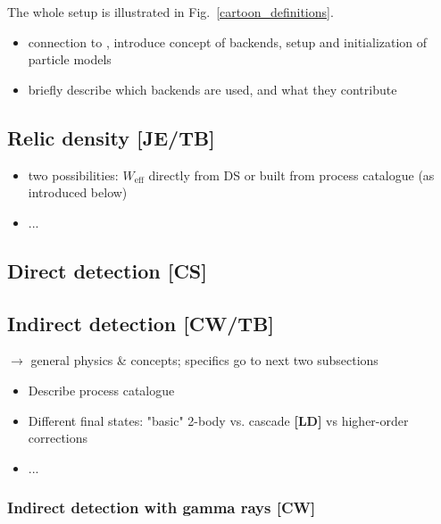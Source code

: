 The whole setup is illustrated in Fig.~\ref{cartoon_definitions}.

\begin{itemize}
  \item connection to \GB, introduce concept of backends, setup and
    initialization of particle models
  \item briefly describe which backends are used, and what they contribute 
\end{itemize}

\subsection{Relic density {\bf [JE/TB]}}
\label{code_rd}
\begin{itemize}
  \item two possibilities: $W_\mathrm{eff}$ directly from DS or built from
    process catalogue (as introduced below)
  \item...
\end{itemize}

\subsection{Direct detection {\bf [CS]}}
\label{code_dd}


\subsection{Indirect detection {\bf [CW/TB]}}
\label{code_id}

$\to$ general physics \& concepts; specifics go to next two subsections
\begin{itemize}
\item Describe process catalogue 
\item Different final states: "basic" 2-body vs. cascade {\bf [LD]} vs higher-order corrections
\item...
\end{itemize}

\subsubsection{Indirect detection with gamma rays {\bf [CW]}}
\label{code_ga}

